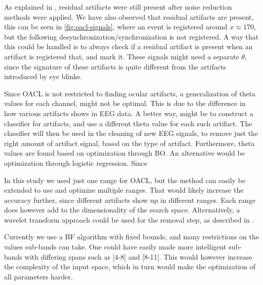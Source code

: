 As explained in \cite{hoffmann2008correction}, residual artifacts were still present after noise reduction methods were applied. We have also observed that residual artifacts are present, this can be seen in \cref{fig:oacl-signals}, where an event is registered around $x \approx 170$, but the following desynchronization/synchronization is not registered. A way that this could be handled is to always check if a residual artifact is present when an artifact is registered that, and mark it. These signals might need a separate $\theta$, since the signature of these artifacts is quite different from the artifacts introduced by eye blinks.

Since OACL is not restricted to finding ocular artifacts, a generalization of theta values for each channel, might not be optimal. This is due to the difference in how various artifacts shows in EEG data. A better way, might be to construct a classifier for artifacts, and use a different theta value for each such artifact. The classifier will then be used in the cleaning of new EEG signals, to remove just the right amount of artifact signal, based on the type of artifact. Furthermore, theta values are found based on optimization through BO. An alternative would be optimization through logistic regression. Since  

In this study we used just one range for OACL, but the method can easily be extended to use and optimize multiple ranges. That would likely increase the accuracy further, since different artifacts show up in different ranges. Each range does however add to the dimensionality of the search space. Alternatively, a wavelet transform approach could be used for the removal step, as described in \citep{krishnaveni2006automatic}.

Currently we use a BF algorithm with fixed bounds, and many restrictions on the values sub-bands can take. One could have easily made more intelligent sub-bands with differing spans such as [4-8] and [8-11]. This would however increase the complexity of the input space, which in turn would make the optimization of all parameters harder. 
